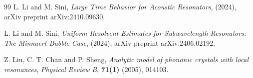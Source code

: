 \documentclass[11pt,reqno,twoside]{amsart}
\theoremstyle{definition}
\theoremstyle{remark}
\numberwithin{equation}{section}
\begin{document}
\begin{thebibliography}{99}
	L. Li and M. Sini, {\it Large Time Behavior for Acoustic Resonators}, (2024), arXiv preprint arXiv:2410.09630.
	
	L. Li and M. Sini, {\it Uniform Resolvent Estimates for Subwavelength Resonators: The Minnaert Bubble Case}, (2024), arXiv preprint arXiv:2406.02192.
	
	Z. Liu, C. T. Chan and P. Sheng, {\it Analytic model of phononic crystals with local resonances}, {\em Physical Review B}, {\bf 71(1)} (2005), 014103.
	
	
	
	
	
	
	
	
	
	
	
	
	
	
	
	
	
	


\end{thebibliography}
\end{document}
